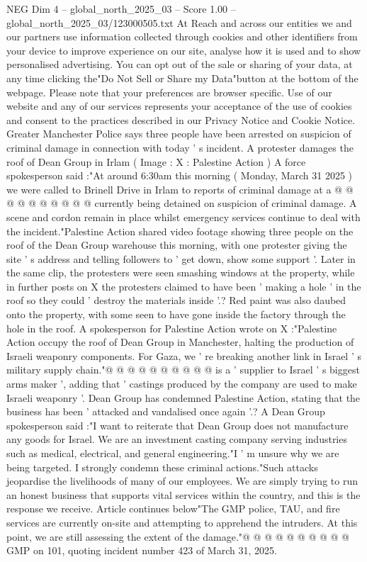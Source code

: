 \begin{textsample}{NEG Dim 4 – global\_north\_2025\_03 – Score 1.00 – global\_north\_2025\_03/123000505.txt}  \label{ex:f4_neg_392}
At Reach and across our entities we and our partners use information collected through cookies and other identifiers from your device to improve experience on our site, analyse how it is used and to show personalised advertising.
You can opt out of the sale or sharing of your data, at any time clicking the"Do Not Sell or Share my Data"button at the bottom of the webpage.
Please note that your preferences are browser specific.
Use of our website and any of our services represents your acceptance of the use of cookies and consent to the practices described in our Privacy Notice and Cookie Notice.
Greater Manchester Police says three people have been arrested on suspicion of criminal damage in connection with today ' s incident.
A protester damages the roof of Dean Group in Irlam ( Image : X : Palestine Action ) A force spokesperson said :"At around 6:30am this morning ( Monday, March 31 2025 ) we were called to Brinell Drive in Irlam to reports of criminal damage at a @ @ @ @ @ @ @ @ @ @ currently being detained on suspicion of criminal damage.
A scene and cordon remain in place whilst emergency services continue to deal with the incident."Palestine Action shared video footage showing three people on the roof of the Dean Group warehouse this morning, with one protester giving the site ' s address and telling followers to ' get down, show some support '.
Later in the same clip, the protesters were seen smashing windows at the property, while in further posts on X the protesters claimed to have been ' making a hole ' in the roof so they could ' destroy the materials inside '.?
Red paint was also daubed onto the property, with some seen to have gone inside the factory through the hole in the roof.
A spokesperson for Palestine Action wrote on X :"Palestine Action occupy the roof of Dean Group in Manchester, halting the production of Israeli weaponry components.
For Gaza, we ' re breaking another link in Israel ' s military supply chain."@ @ @ @ @ @ @ @ @ @ is a ' supplier to Israel ' s biggest arms maker ', adding that ' castings produced by the company are used to make Israeli weaponry '.
Dean Group has condemned Palestine Action, stating that the business has been ' attacked and vandalised once again '.?
A Dean Group spokesperson said :"I want to reiterate that Dean Group does not manufacture any goods for Israel.
We are an investment casting company serving industries such as medical, electrical, and general engineering."I ' m unsure why we are being targeted.
I strongly condemn these criminal actions."Such attacks jeopardise the livelihoods of many of our employees.
We are simply trying to run an honest business that supports vital services within the country, and this is the response we receive.
Article continues below"The GMP police, TAU, and fire services are currently on-site and attempting to apprehend the intruders.
At this point, we are still assessing the extent of the damage."@ @ @ @ @ @ @ @ @ @ GMP on 101, quoting incident number 423 of March 31, 2025.

\end{textsample}
